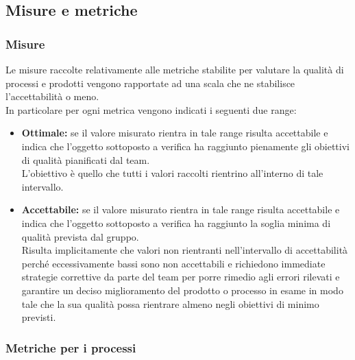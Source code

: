 	\subsection{Misure e metriche \label{S5}}
		\subsubsection{Misure}
		Le misure raccolte relativamente alle metriche stabilite per valutare la qualità di processi e prodotti vengono rapportate ad una scala che ne stabilisce l'accettabilità o meno. \\In particolare per ogni metrica vengono indicati i seguenti due range:
			\begin{itemize}
				\item \textbf{Ottimale:} se il valore misurato rientra in tale range risulta accettabile e indica che l'oggetto sottoposto a verifica ha raggiunto pienamente gli obiettivi di qualità pianificati dal team. \\L'obiettivo è quello che tutti i valori raccolti rientrino all'interno di tale intervallo.
				\item \textbf{Accettabile:} se il valore misurato rientra in tale range risulta accettabile e indica che l'oggetto sottoposto a verifica ha raggiunto la soglia minima di qualità prevista dal gruppo.
			\\Risulta implicitamente che valori non rientranti nell'intervallo di accettabilità perché eccessivamente bassi sono non accettabili e richiedono immediate strategie correttive da parte del team per porre rimedio agli errori rilevati e garantire un deciso miglioramento del prodotto o processo in esame in modo tale che la sua qualità possa rientrare almeno negli obiettivi di minimo previsti.		
			\end{itemize}
	

		\subsubsection{Metriche per i processi}
